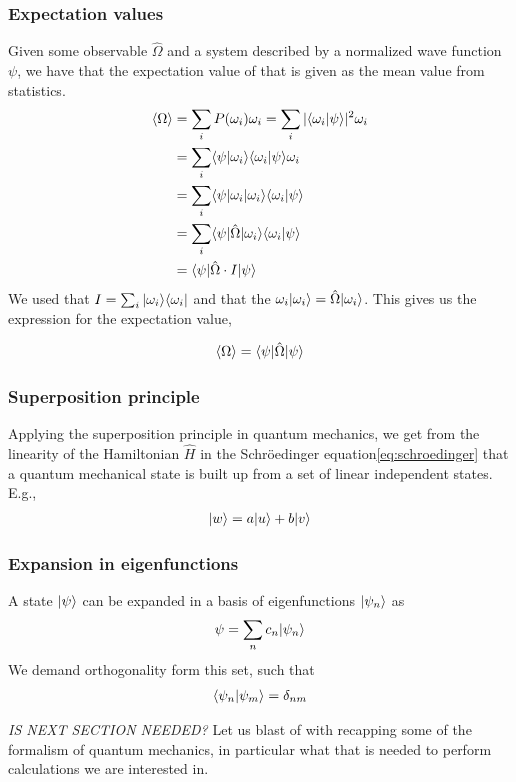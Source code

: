 \subsubsection{Expectation values}
Given some observable $\hat{\Omega}$ and a system described by a normalized wave function $\psi$, we have that the expectation value of that is given as the mean value from statistics.
\begin{align*}
	\langle \Omega \rangle &= \sum_i P(\omega_i) \omega_i = \sum_i |\langle{\omega_i}|\psi\rangle|^2\omega_i \\
	&= \sum_i \langle{\psi}|\omega_i\rangle \langle\omega_i |{\psi}\rangle \omega_i \\
	&= \sum_i \langle{\psi}| \omega_i |{\omega_i}\rangle \langle\omega_i |{\psi}\rangle \\
	&= \sum_i \langle{\psi}| \hat{\Omega} |{\omega_i}\rangle \langle\omega_i |{\psi}\rangle \\
	&= \langle{\psi}| \hat{\Omega} \cdot I |{\psi}\rangle \\
\end{align*}
We used that $I = \sum_i |{\omega_i}\rangle\langle{\omega_i}|$ and that the $\omega_i|{{\omega_i}}\rangle = \hat{\Omega}|{\omega_i}\rangle$. This gives us the expression for the expectation value,

\begin{align}
	\left\langle{\Omega}\right\rangle = \langle{\psi}| \hat{\Omega} |{\psi}\rangle
	\label{eq:expectation-value}
\end{align}

\subsubsection{Superposition principle}
Applying the superposition principle in quantum mechanics, we get from the linearity of the Hamiltonian $\hat{H}$ in the Schröedinger equation\eqref{eq:schroedinger} that a quantum mechanical state is built up from a set of linear independent states. E.g.,
\begin{align*}
	|{w}\rangle = a|{u}\rangle + b|{v}\rangle
\end{align*}

\subsubsection{Expansion in eigenfunctions}
A state $|{\psi}\rangle$ can be expanded in a basis of eigenfunctions $|{\psi_n}\rangle$ as
\begin{align}
	\psi = \sum_n c_n |{\psi_n}\rangle
	\label{eq:eigenfunction-expansion}
\end{align}
We demand orthogonality form this set, such that 
\begin{align}
	\langle{\psi_n}|\psi_m\rangle = \delta_{nm}
	\label{eq:eig-func-orthogonality}
\end{align}

\textit{IS NEXT SECTION NEEDED?}
Let us blast of with recapping some of the formalism of quantum mechanics, in particular what that is needed to perform calculations we are interested in.